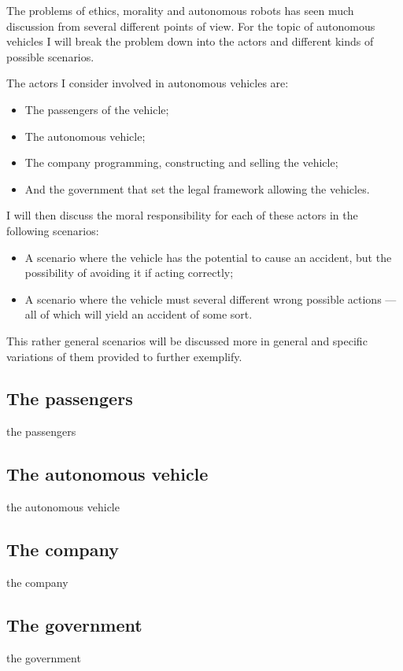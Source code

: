 The problems of ethics, morality and autonomous robots has seen much discussion
from several different points of view. For the topic of autonomous vehicles I
will break the problem down into the actors and different kinds of possible scenarios.

The actors I consider involved in autonomous vehicles are:
\begin{itemize}
\item The passengers of the vehicle;
\item The autonomous vehicle;
\item The company programming, constructing and selling the vehicle;
\item And the government that set the legal framework allowing the vehicles.
\end{itemize}

I will then discuss the moral responsibility for each of these actors in the
following scenarios:
\begin{itemize}
\item A scenario where the vehicle has the potential to cause an accident, but
  the possibility of avoiding it if acting correctly;
\item A scenario where the vehicle must several different wrong possible actions
  --- all of which will yield an accident of some sort.
\end{itemize}

This rather general scenarios will be discussed more in general and specific
variations of them provided to further exemplify.

\subsection{The passengers}
the passengers

\subsection{The autonomous vehicle}
the autonomous vehicle

\subsection{The company}
the company

\subsection{The government}
the government